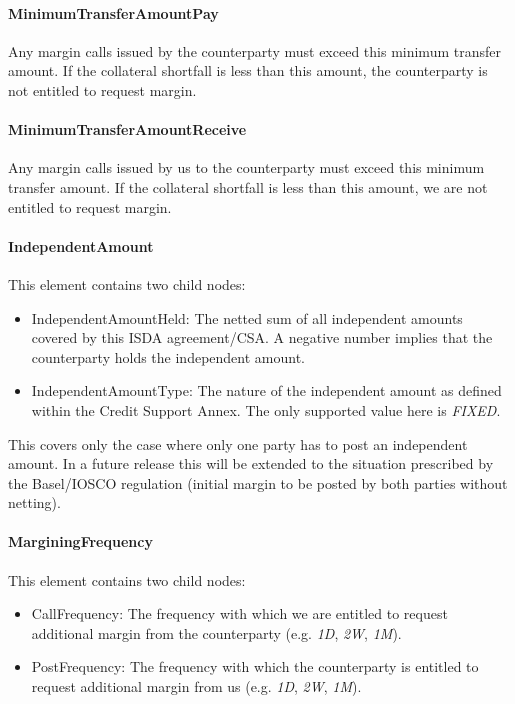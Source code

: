 \paragraph*{MinimumTransferAmountPay} Any margin calls issued by the
counterparty must exceed this minimum transfer amount. If the
collateral shortfall is less than this amount, the counterparty is not
entitled to request margin.

\paragraph*{MinimumTransferAmountReceive} Any margin calls issued by us
to the counterparty must exceed this minimum transfer amount. If the
collateral shortfall is less than this amount, we are  not
entitled to request margin.

\paragraph*{IndependentAmount} This element contains two child nodes:
\begin{itemize}
\item IndependentAmountHeld: The netted sum of all independent amounts
  covered by this ISDA agreement/CSA. A negative number implies that
  the counterparty holds the independent amount.
\item IndependentAmountType: The nature of the independent amount as
  defined within the Credit Support Annex. The only supported value
  here is \emph{FIXED}. 
\end{itemize}
This covers only the case where only one party has to post an
independent amount. In a future release this will be extended to the
situation prescribed by the Basel/IOSCO regulation (initial margin to
be posted by both parties without netting).

\paragraph*{MarginingFrequency} This element contains two child nodes:
\begin{itemize}
\item CallFrequency: The frequency with which we are entitled to
  request additional margin from the counterparty (e.g. \emph{1D},
  \emph{2W}, \emph{1M}).
\item PostFrequency: The frequency with which the counterparty is entitled to
  request additional margin from us (e.g. \emph{1D},
  \emph{2W}, \emph{1M}).
\end{itemize}

